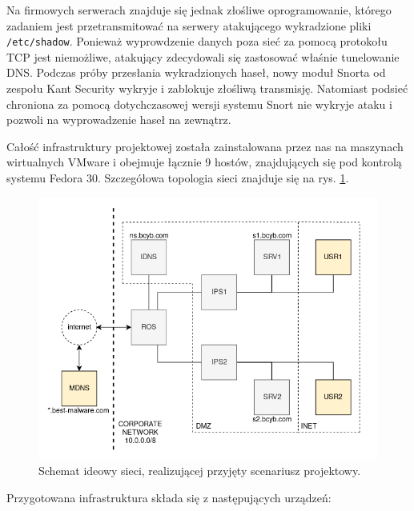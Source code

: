 \documentclass{eiti-raport}
\begin{document}
Na firmowych serwerach znajduje się jednak złośliwe oprogramowanie, którego zadaniem jest przetransmitować na serwery atakującego wykradzione pliki \texttt{/etc/shadow}. Ponieważ wyprowdzenie danych poza sieć za pomocą protokołu TCP jest niemożliwe, atakujący zdecydowali się zastosować właśnie tunelowanie DNS. Podczas próby przesłania wykradzionych haseł, nowy moduł Snorta od zespołu Kant Security wykryje i zablokuje złośliwą transmisję. Natomiast podsieć chroniona za pomocą dotychczasowej wersji systemu Snort nie wykryje ataku i pozwoli na wyprowadzenie haseł na zewnątrz. 

Całość infrastruktury projektowej została zainstalowana przez nas na maszynach wirtualnych VMware i obejmuje łącznie 9 hostów, znajdujących się pod kontrolą systemu Fedora 30. Szczegółowa topologia sieci znajduje się na rys. \ref{fig:topologia}. 
\begin{figure}[!h] \centering
	\includegraphics[width=0.9\linewidth]{img/BCYB_topologia.png}
	\caption{Schemat ideowy sieci, realizującej przyjęty scenariusz projektowy.} \label{fig:topologia}
\end{figure}
Przygotowana infrastruktura składa się z następujących urządzeń: 
\end{document}
